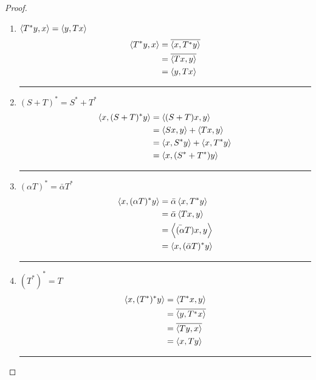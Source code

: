 \begin{proof}
	\begin{enumerate}
	\item $\left\langle T^\ast y,x \right\rangle = \left\langle y,Tx \right\rangle$
		\begin{align*}
			\left\langle T^\ast y,x \right\rangle & = \overline{\left\langle x,T^\ast y \right\rangle} \\
			& = \overline{\left\langle Tx,y \right\rangle} \\
			& = \left\langle y,Tx \right\rangle
		\end{align*}

	\hrule \vspace{1em}

	\item $(S+T)^\ast = S^\ast + T^\ast$
		\begin{align*}
			\left\langle x,(S+T)^\ast y \right\rangle
			& = \left\langle (S+T)x,y \right\rangle \\
			& = \left\langle Sx,y \right\rangle + \left\langle Tx,y \right\rangle \\
			& = \left\langle x,S^\ast y \right\rangle + \left\langle x,T^\ast y \right\rangle \\
			& = \left\langle x,(S^\ast+T^\ast)y \right\rangle\\
		\end{align*}

	\hrule \vspace{1em}

	\item $(\alpha T)^\ast = \bar{\alpha} T^\ast$
		\begin{align*}
			\left\langle x,(\alpha T)^\ast y \right\rangle
			& = \bar{\alpha} \left\langle x,T^\ast y \right\rangle \\
			& = \bar{\alpha} \left\langle Tx,y \right\rangle \\
			& = \left\langle \bar{(\alpha}T)x,y \right\rangle \\
			& = \left\langle x,(\bar{\alpha}T)^\ast y \right\rangle
		\end{align*}

	\hrule \vspace{1em}

	\item $(T^\ast)^\ast = T$
		\begin{align*}
			\left\langle x,(T^\ast)^\ast y \right\rangle
			& = \left\langle T^\ast x,y \right\rangle\\
			& = \overline{\left\langle y,T^\ast x \right\rangle} \\
			& = \overline{\left\langle Ty,x \right\rangle} \\
			& = \left\langle x,Ty \right\rangle
		\end{align*}

	\hrule \vspace{1em}


\end{enumerate}
\end{proof}
